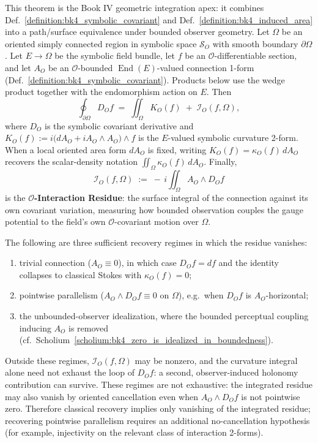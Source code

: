 \begin{theorem}
\label{theorem:bk4_symbolic_stokes}
This theorem is the Book IV geometric integration apex: it combines Def.~\ref{definition:bk4_symbolic_covariant} and Def.~\ref{definition:bk4_induced_area} into a path/surface equivalence under bounded observer geometry.
Let $\Omega$ be an oriented simply connected region in symbolic space $\mathcal{S}_O$ with smooth boundary $\partial\Omega$. Let $E\to\Omega$ be the symbolic field bundle, let $f$ be an $\mathcal{O}$-differentiable section, and let $A_O$ be an $\mathcal{O}$-bounded $\operatorname{End}(E)$-valued connection 1-form (Def.~\ref{definition:bk4_symbolic_covariant}). Products below use the wedge product together with the endomorphism action on $E$. Then
\[
\oint_{\partial\Omega} D_O f \;=\; \iint_\Omega K_O(f) \;+\; \mathcal{I}_O(f,\Omega),
\]
where $D_O$ is the symbolic covariant derivative and $K_O(f):=i\bigl(dA_O+iA_O\wedge A_O\bigr)\wedge f$ is the $E$-valued symbolic curvature 2-form. When a local oriented area form $dA_O$ is fixed, writing $K_O(f)=\kappa_O(f)\,dA_O$ recovers the scalar-density notation $\iint_\Omega\kappa_O(f)\,dA_O$. Finally,
\[
\mathcal{I}_O(f,\Omega) \;:=\; -\, i \iint_\Omega A_O \wedge D_O f
\]
is the \textbf{$\mathcal{O}$-Interaction Residue}: the surface integral of the connection against its own covariant variation, measuring how bounded observation couples the gauge potential to the field's own $\mathcal{O}$-covariant motion over $\Omega$.

The following are three sufficient recovery regimes in which the residue vanishes:
\begin{enumerate}
    \item trivial connection ($A_O \equiv 0$), in which case $D_O f = df$ and the identity collapses to classical Stokes with $\kappa_O(f) = 0$;
    \item pointwise parallelism ($A_O \wedge D_O f \equiv 0$ on $\Omega$), e.g.\ when $D_O f$ is $A_O$-horizontal;
    \item the unbounded-observer idealization, where the bounded perceptual coupling inducing $A_O$ is removed (cf.\ Scholium~\ref{scholium:bk4_zero_is_idealized_in_boundedness}).
\end{enumerate}
Outside these regimes, $\mathcal{I}_O(f,\Omega)$ may be nonzero, and the curvature integral alone need not exhaust the loop of $D_O f$: a second, observer-induced holonomy contribution can survive. These regimes are not exhaustive: the integrated residue may also vanish by oriented cancellation even when $A_O\wedge D_Of$ is not pointwise zero. Therefore classical recovery implies only vanishing of the integrated residue; recovering pointwise parallelism requires an additional no-cancellation hypothesis (for example, injectivity on the relevant class of interaction 2-forms).
\end{theorem}

